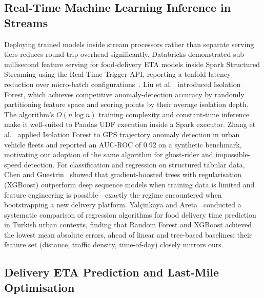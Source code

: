 \documentclass[conference]{IEEEtran}
\begin{document}
\subsection{Real-Time Machine Learning Inference in Streams}

Deploying trained models inside stream processors rather than separate
serving tiers reduces round-trip overhead significantly. Databricks
demonstrated sub-millisecond feature serving for food-delivery ETA models
inside Spark Structured Streaming using the Real-Time Trigger API,
reporting a tenfold latency reduction over micro-batch
configurations~\cite{databricks2024realtime}. Liu et
al.~\cite{liu2008isolation} introduced Isolation Forest, which
achieves competitive anomaly-detection accuracy by randomly partitioning
feature space and scoring points by their average isolation depth.
The algorithm's $O(n \log n)$ training complexity and constant-time
inference make it well-suited to Pandas UDF execution inside a Spark
executor. Zhang et al.~\cite{zhang2021anomaly} applied Isolation
Forest to GPS trajectory anomaly detection in urban vehicle fleets
and reported an AUC-ROC of 0.92 on a synthetic benchmark, motivating
our adoption of the same algorithm for ghost-rider and impossible-speed
detection. For classification and regression on structured tabular data,
Chen and Guestrin~\cite{chen2016xgboost} showed that gradient-boosted
trees with regularisation (XGBoost) outperform deep sequence models
when training data is limited and feature engineering is
possible—exactly the regime encountered when bootstrapping a new
delivery platform. Yalçinkaya and Areta~\cite{yalcinkaya2024eta}
conducted a systematic comparison of regression algorithms for food
delivery time prediction in Turkish urban contexts, finding that Random
Forest and XGBoost achieved the lowest mean absolute errors, ahead of
linear and tree-based baselines; their feature set (distance,
traffic density, time-of-day) closely mirrors ours.

\subsection{Delivery ETA Prediction and Last-Mile Optimisation}
\end{document}
